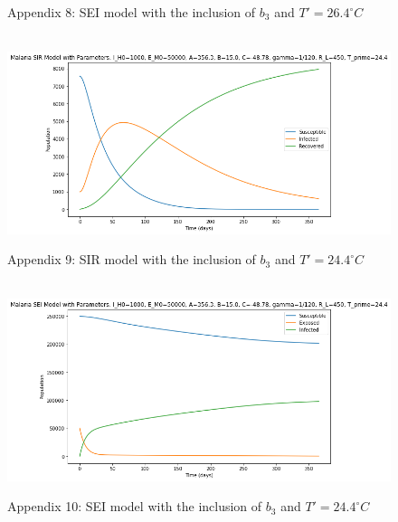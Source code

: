 \documentclass[
	12pt,				%
	oneside,			%
	a4paper,			%
	english,			%
	brazil				%
	]{abntex2}
\begin{document}
\begin{apendicesenv}
\begin{figure}[!ht]
	\caption*{Appendix 8: SEI model with the inclusion of $b_3$ and $T'=26.4^\circ C$}
\end{figure}
\newpage
\begin{figure}[!ht]
	\centering
	\hbox{\hspace{-1.0em} \includegraphics[scale=0.6] {THESIS-SIR_Correcao_b3_T_linha_24_4.png}}
	\caption*{Appendix 9: SIR model with the inclusion of $b_3$ and $T'=24.4^\circ C$}
\end{figure} 
\begin{figure}[!ht]
	\centering
	\hbox{\hspace{-1.0em} \includegraphics[scale=0.6] {THESIS-SEI_Correcao_b3_T_linha_24_4.png}}
	\caption*{Appendix 10: SEI model with the inclusion of $b_3$ and $T'=24.4^\circ C$}
\end{figure}
\newpage


\end{apendicesenv}
\end{document}
